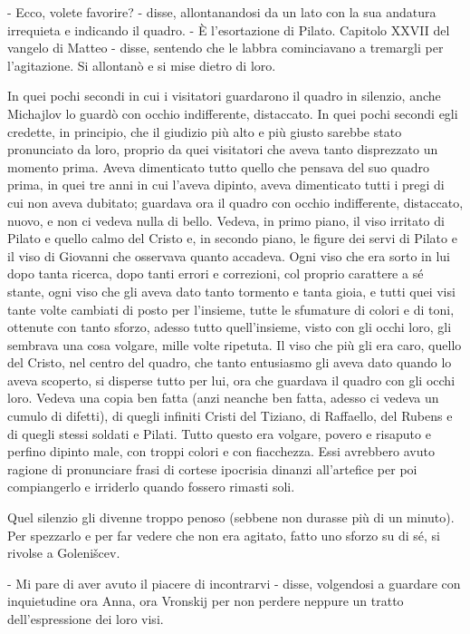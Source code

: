 - Ecco, volete favorire? - disse, allontanandosi da un lato con la sua andatura irrequieta e indicando il quadro. - È l'esortazione di Pilato. Capitolo XXVII del vangelo di Matteo - disse, sentendo che le labbra cominciavano a tremargli per l'agitazione. Si allontanò e si mise dietro di loro. 

In quei pochi secondi in cui i visitatori guardarono il quadro in silenzio, anche Michajlov lo guardò con occhio indifferente, distaccato. In quei pochi secondi egli credette, in principio, che il giudizio più alto e più giusto sarebbe stato pronunciato da loro, proprio da quei visitatori che aveva tanto disprezzato un momento prima. Aveva dimenticato tutto quello che pensava del suo quadro prima, in quei tre anni in cui l'aveva dipinto, aveva dimenticato tutti i pregi di cui non aveva dubitato; guardava ora il quadro con occhio indifferente, distaccato, nuovo, e non ci vedeva nulla di bello. Vedeva, in primo piano, il viso irritato di Pilato e quello calmo del Cristo e, in secondo piano, le figure dei servi di Pilato e il viso di Giovanni che osservava quanto accadeva. Ogni viso che era sorto in lui dopo tanta ricerca, dopo tanti errori e correzioni, col proprio carattere a sé stante, ogni viso che gli aveva dato tanto tormento e tanta gioia, e tutti quei visi tante volte cambiati di posto per l'insieme, tutte le sfumature di colori e di toni, ottenute con tanto sforzo, adesso tutto quell'insieme, visto con gli occhi loro, gli sembrava una cosa volgare, mille volte ripetuta. Il viso che più gli era caro, quello del Cristo, nel centro del quadro, che tanto entusiasmo gli aveva dato quando lo aveva scoperto, si disperse tutto per lui, ora che guardava il quadro con gli occhi loro. Vedeva una copia ben fatta (anzi neanche ben fatta, adesso ci vedeva un cumulo di difetti), di quegli infiniti Cristi del Tiziano, di Raffaello, del Rubens e di quegli stessi soldati e Pilati. Tutto questo era volgare, povero e risaputo e perfino dipinto male, con troppi colori e con fiacchezza. Essi avrebbero avuto ragione di pronunciare frasi di cortese ipocrisia dinanzi all'artefice per poi compiangerlo e irriderlo quando fossero rimasti soli. 

Quel silenzio gli divenne troppo penoso (sebbene non durasse più di un minuto). Per spezzarlo e per far vedere che non era agitato, fatto uno sforzo su di sé, si rivolse a Golenišcev. 

- Mi pare di aver avuto il piacere di incontrarvi - disse, volgendosi a guardare con inquietudine ora Anna, ora Vronskij per non perdere neppure un tratto dell'espressione dei loro visi. 

